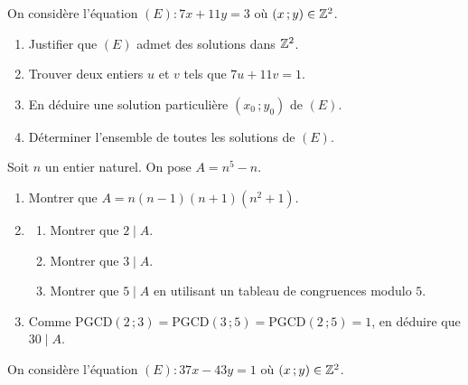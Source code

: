 
On considère l'équation $(E) : 7x + 11y = 3$ où $(x\,;y) \in \mathbb{Z}^2$.

\begin{enumerate}
	\item Justifier que $(E)$ admet des solutions dans $\mathbb{Z}^2$.
	\item Trouver deux entiers $u$ et $v$ tels que $7u + 11v = 1$.
	\item En déduire une solution particulière $(x_0\,;y_0)$ de $(E)$.
	\item Déterminer l'ensemble de toutes les solutions de $(E)$.
\end{enumerate}



Soit $n$ un entier naturel. On pose $A = n^5 - n$.

\begin{enumerate}
	\item Montrer que $A = n(n-1)(n+1)(n^2+1)$.

	\item
	\begin{enumerate}
		\item Montrer que $2 \mid A$.
		\item Montrer que $3 \mid A$.
		\item Montrer que $5 \mid A$ en utilisant un tableau de congruences modulo $5$.
	\end{enumerate}

	\item Comme $\mathrm{PGCD}(2\,;3) = \mathrm{PGCD}(3\,;5) = \mathrm{PGCD}(2\,;5) = 1$,
	en déduire que $30 \mid A$.
\end{enumerate}



On considère l'équation $(E) : 37x - 43y = 1$ où $(x\,;y) \in \mathbb{Z}^2$.

